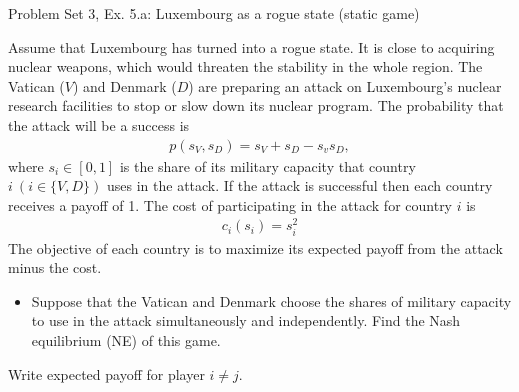 \begin{frame}{Problem Set 3, Ex. 5.a: Luxembourg as a rogue state (static game)}
  \begin{multicols}{2}
    Assume that Luxembourg has turned into a rogue state. It is close to acquiring nuclear weapons, which would threaten the stability in the whole region. The Vatican ($V$) and Denmark ($D$) are preparing an attack on Luxembourg’s nuclear research facilities to stop or slow down its nuclear program. The probability that the attack will be a success is
    \begin{align*}
      p(s_V,s_D)=s_V+s_D-s_vs_D,
    \end{align*}
    where $s_i\in[0,1]$ is the share of its military capacity that country $i\ (i\in\{V,D\})$ uses in the attack. If the attack is successful then each country receives a payoff of 1. The cost of participating in the attack for country $i$ is
    \begin{align*}
      c_i(s_i)=s_i^2
    \end{align*}
    The objective of each country is to maximize its expected payoff from the attack minus the cost.
  \vfill\null\columnbreak
    \begin{itemize}
      \item[(a)] Suppose that the Vatican and Denmark choose the shares of military capacity to use in the attack simultaneously and independently. Find the Nash equilibrium (NE) of this game.
    \end{itemize}
    Write expected payoff for player $i\neq j$.
  \vfill\null
  \end{multicols}
\end{frame}
